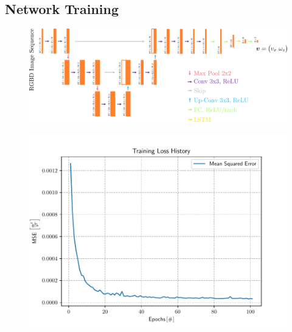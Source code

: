 \subsection{Network Training}
\begin{figure}[h]
	\centering
	\includegraphics[scale=.5]{chapters/05_experiments/02_autonomous_walking/unet.png}
	\caption{}
	\label{fig::524_unet}
\end{figure}
\begin{figure}[h]
	\centering
	\includegraphics[scale=.6]{chapters/05_experiments/02_autonomous_walking/05_07_19_loss_history.pdf}
	\caption{}
	\label{fig::524_loss}
\end{figure}
